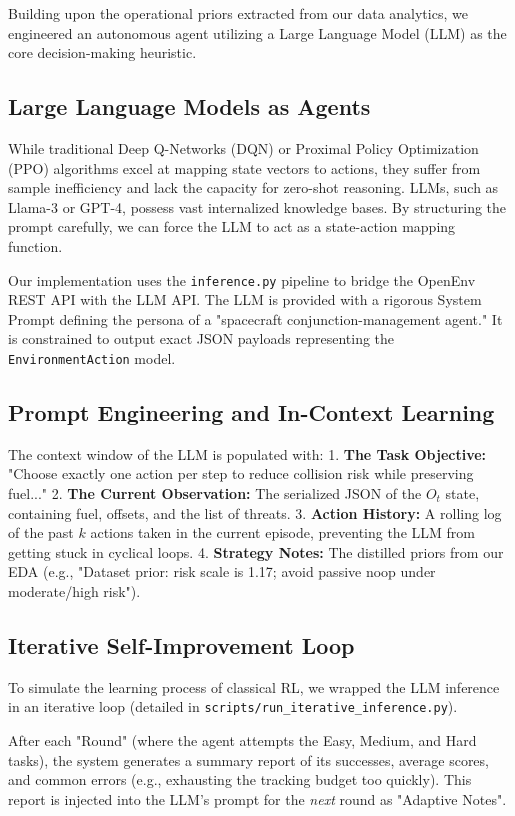 \documentclass[10pt,journal,compsoc]{IEEEtran}
\begin{document}
Building upon the operational priors extracted from our data analytics, we engineered an autonomous agent utilizing a Large Language Model (LLM) as the core decision-making heuristic.

\subsection{Large Language Models as Agents}
While traditional Deep Q-Networks (DQN) or Proximal Policy Optimization (PPO) algorithms excel at mapping state vectors to actions, they suffer from sample inefficiency and lack the capacity for zero-shot reasoning. LLMs, such as Llama-3 or GPT-4, possess vast internalized knowledge bases. By structuring the prompt carefully, we can force the LLM to act as a state-action mapping function.

Our implementation uses the \texttt{inference.py} pipeline to bridge the OpenEnv REST API with the LLM API. The LLM is provided with a rigorous System Prompt defining the persona of a "spacecraft conjunction-management agent." It is constrained to output exact JSON payloads representing the \texttt{EnvironmentAction} model.

\subsection{Prompt Engineering and In-Context Learning}
The context window of the LLM is populated with:
1. \textbf{The Task Objective:} "Choose exactly one action per step to reduce collision risk while preserving fuel..."
2. \textbf{The Current Observation:} The serialized JSON of the $O_t$ state, containing fuel, offsets, and the list of threats.
3. \textbf{Action History:} A rolling log of the past $k$ actions taken in the current episode, preventing the LLM from getting stuck in cyclical loops.
4. \textbf{Strategy Notes:} The distilled priors from our EDA (e.g., "Dataset prior: risk scale is 1.17; avoid passive noop under moderate/high risk").

\subsection{Iterative Self-Improvement Loop}
To simulate the learning process of classical RL, we wrapped the LLM inference in an iterative loop (detailed in \texttt{scripts/run\_iterative\_inference.py}). 

After each "Round" (where the agent attempts the Easy, Medium, and Hard tasks), the system generates a summary report of its successes, average scores, and common errors (e.g., exhausting the tracking budget too quickly). This report is injected into the LLM's prompt for the \textit{next} round as "Adaptive Notes". 
\end{document}

